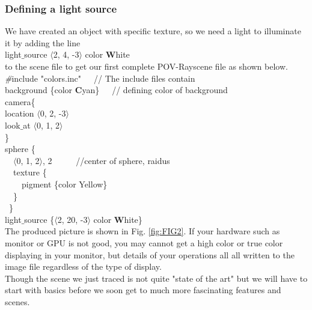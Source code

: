 \documentclass[fleqn,10pt]{wlscirep}
\newcommand*{\PV}{POV-Ray}
\begin{document}
\subsubsection{Defining a light source}
We have created an object with specific texture, so we need a light to illuminate it by adding the line \\
\textcolor[rgb]{0.2,0.1,1}{light$\_$source {$\langle$2, 4, -3$\rangle$ color \textbf{W}hite}} \\
to the scene file to get our first complete \PV scene file as shown below.\\
\textcolor[rgb]{0.2,0.1,1}{\emph{\#}include "colors.inc"}\ \ \     // The include files contain \\
\textcolor[rgb]{0.2,0.1,1}{background \{color \textbf{C}yan\}}\ \ \ // defining color of background \\
\textcolor[rgb]{0.2,0.1,1}{camera\{}  \\
\textcolor[rgb]{0.2,0.1,1}{  location $\langle$0, 2, -3$\rangle$}  \\
\textcolor[rgb]{0.2,0.1,1}{  look$\_$at $\langle$0, 1, 2$\rangle$}  \\
\textcolor[rgb]{0.2,0.1,1}{\}} \\
\textcolor[rgb]{0.2,0.1,1}{sphere \{} \\
\textcolor[rgb]{0.2,0.1,1}{\ \ $\langle$0, 1, 2$\rangle$, 2}    \ \ \ \ \  //center of sphere, raidus\\
\textcolor[rgb]{0.2,0.1,1}{\ \ texture \{} \\
\textcolor[rgb]{0.2,0.1,1}{\ \ \ \ pigment \{color Yellow\}} \\
\textcolor[rgb]{0.2,0.1,1}{\ \ \}} \\
\textcolor[rgb]{0.2,0.1,1}{\ \}} \\
\textcolor[rgb]{0.2,0.1,1}{light$\_$source \{$\langle$2, 20, -3$\rangle$ color \textbf{W}hite\}} \\
\newline
The produced picture is shown in Fig. \ref{fig:FIG2}. If your hardware such as monitor or GPU is not good, you may cannot get a high color or true color displaying in your monitor, but details of your operations all all written to the image file regardless of the type of display.\\

Though the scene we just traced is not quite "state of the art" but we will have to start with basics before we soon get to much more fascinating features and scenes.
\end{document}
